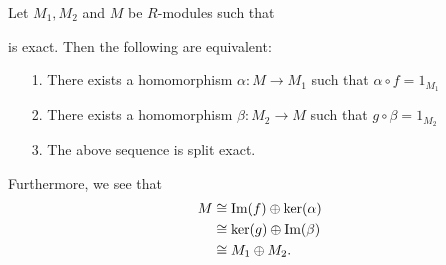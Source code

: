 \begin{thm}\label{split_exact_lemma}
    Let $M_1, M_2$ and $M$ be $R$-modules such that 
    \begin{center}
    \end{center} 
    is exact. Then the following are equivalent:
    \begin{itemize}
        \item[1.] There exists a homomorphism $\alpha : M \to M_1$
        such that $\alpha \circ f = 1_{M_1}$ 
        \item[2.] There exists a homomorphism $\beta: M_2 \to M$
        such that $g \circ \beta = 1_{M_2}$ 
        \item[3.] The above sequence is split exact. 
    \end{itemize}
    Furthermore, we see that 
    \begin{align*}
        M &\cong \mbox{Im}(f) \oplus \ker(\alpha)\\
        &\cong \ker(g) \oplus \mbox{Im}(\beta)\\
        &\cong M_1 \oplus M_2.
    \end{align*} 
    \vspace{-.5cm}

\end{thm}




